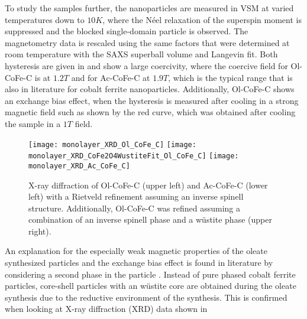 \documentclass[\main/dresen_thesis.tex]{subfiles}
\begin{document}
    To study the samples further, the nanoparticles are measured in VSM at varied temperatures down to $10 \unit{K}$, where the N\'eel relaxation of the superspin moment is suppressed and the blocked single-domain particle is observed.
    The magnetometry data is rescaled using the same factors that were determined at room temperature with the SAXS superball volume and Langevin fit.
    Both hysteresis are given in  and show a large coercivity, where the coercive field for Ol-CoFe-C is at $1.2 \unit{T}$ and for Ac-CoFe-C at $1.9 \unit{T}$, which is the typical range that is also in literature for cobalt ferrite nanoparticles.
    Additionally, Ol-CoFe-C shows an exchange bias effect, when the hysteresis is measured after cooling in a strong magnetic field such as shown by the red curve, which was obtained after cooling the sample in a $1 \unit{T}$ field.

    \begin{figure}[tb]
      \centering
      \texttt{[image: monolayer\_XRD\_Ol\_CoFe\_C]}
      \texttt{[image: monolayer\_XRD\_CoFe2O4WustiteFit\_Ol\_CoFe\_C]}
      \texttt{[image: monolayer\_XRD\_Ac\_CoFe\_C]}
      \caption{\label{fig:monolayers:nanoparticle:xrd}X-ray diffraction of Ol-CoFe-C (upper left) and Ac-CoFe-C (lower left) with a Rietveld refinement assuming an inverse spinell structure. Additionally, Ol-CoFe-C was refined assuming a combination of an inverse spinell phase and a w\"ustite phase (upper right).}
    \end{figure}

    An explanation for the especially weak magnetic properties of the oleate synthesized particles and the exchange bias effect is found in literature by considering a second phase in the particle \cite{Bodnarchuk_2009_Excha, Wetterskog_2013_Anoma}.
    Instead of pure phased cobalt ferrite particles, core-shell particles with an w\"ustite core are obtained during the oleate synthesis due to the reductive environment of the synthesis.
    This is confirmed when looking at X-ray diffraction (XRD) data shown in 
\end{document}
